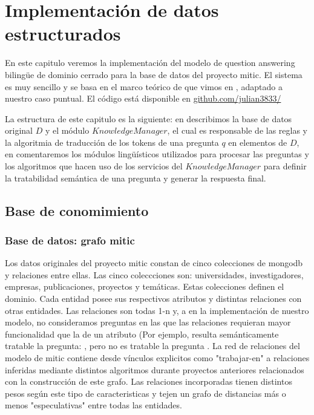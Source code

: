\chapter{Implementación de datos estructurados}
\horrible
En este capitulo veremos la implementación del modelo de question answering bilingüe de dominio cerrado para la base de datos del proyecto mitic. El sistema es muy sencillo y se basa en el marco teórico de \cite{QADB1} que vimos en , adaptado a nuestro caso puntual. El código está disponible en \url{github.com/julian3833/} 

La estructura de este capitulo es la siguiente: en  describimos la base de datos original $D$ y el módulo $KnowledgeManager$, el cual es responsable de las reglas y la algoritmia de traducción de los tokens de una pregunta $q$ en elementos de $D$, en  comentaremos los módulos lingüísticos utilizados para procesar las preguntas y los algoritmos que hacen uso de los servicios del $KnowledgeManager$ para definir la tratabilidad semántica de una pregunta y generar la respuesta final.

\section{Base de conomimiento}
\label{sec:grafo-mitic}

\subsection{Base de datos: grafo mitic}
Los datos originales del proyecto mitic constan de cinco colecciones de mongodb y relaciones entre ellas. Las cinco coleccciones son: universidades, investigadores, empresas, publicaciones, proyectos y temáticas. Estas colecciones definen el dominio. Cada entidad posee sus respectivos atributos y distintas relaciones con otras entidades. Las relaciones son todas 1-n y, a en la implementación de nuestro modelo, no consideramos preguntas en las que las relaciones requieran mayor funcionalidad que la de un atributo (Por ejemplo, resulta semánticamente tratable la pregunta: , pero no es tratable la pregunta . La red de relaciones del modelo de mitic contiene desde vínculos explicitos como "trabajar-en" a relaciones inferidas mediante distintos algoritmos durante proyectos anteriores relacionados con la construcción de este grafo. Las relaciones incorporadas tienen distintos pesos según este tipo de caracteristicas y tejen un grafo de distancias más o menos "especulativas" entre todas las entidades.

